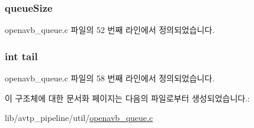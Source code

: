 \subsubsection[{\texorpdfstring{queue\+Size}{queueSize}}]{ queue\+Size}\hypertarget{structopenavb__queue_ae76ce4b41a375022c23a3860f8993fe3}{}\label{structopenavb__queue_ae76ce4b41a375022c23a3860f8993fe3}


openavb\+\_\+queue.\+c 파일의 52 번째 라인에서 정의되었습니다.

\subsubsection[{\texorpdfstring{tail}{tail}}]{\setlength{\rightskip}{0pt plus 5cm}int tail}\hypertarget{structopenavb__queue_aff39d864a6594bc5f4a5e365282e00fe}{}\label{structopenavb__queue_aff39d864a6594bc5f4a5e365282e00fe}


openavb\+\_\+queue.\+c 파일의 58 번째 라인에서 정의되었습니다.



이 구조체에 대한 문서화 페이지는 다음의 파일로부터 생성되었습니다.\+:\begin{DoxyCompactItemize}
\item 
lib/avtp\+\_\+pipeline/util/\hyperlink{openavb__queue_8c}{openavb\+\_\+queue.\+c}\end{DoxyCompactItemize}
